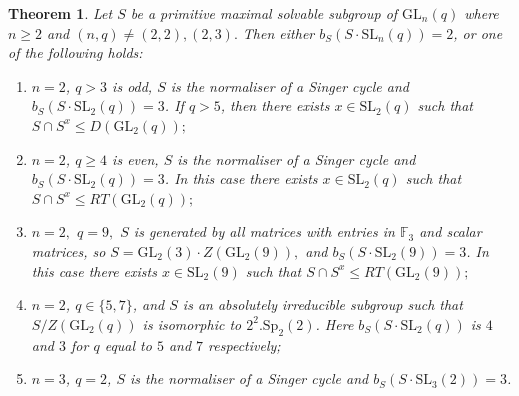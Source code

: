 \documentclass[a4paper,reqno,11pt]{amsart}
\newtheorem{Th}{Theorem}[section]
\theoremstyle{definition}
\theoremstyle{remark}
\numberwithin{equation}{section}
\newcommand{\SL}{{\mathrm{SL}}}
\newcommand{\GL}{{\mathrm{GL}}}
\newcommand{\Sp}{{\mathrm{Sp}}}
\begin{document}
\begin{Th}
\label{sec311lem}
 Let $S$ be a primitive maximal solvable subgroup of $\GL_n(q)$ where $n \ge 2$ and  $(n,q) \ne (2,2), (2,3).$
Then either $b_S(S \cdot \SL_n(q))=2$, or one of the following holds:
\begin{enumerate}[font=\normalfont]
\item $n =2$,  $q>3$ is odd,  $S$ is the normaliser of a Singer cycle and  $b_S(S \cdot \SL_2(q))=3$. If $q>5$, then there exists $x\in \SL_2(q)$ such that  $S \cap S^x \le D(\GL_2(q));$ \label{thirr2odd}
\item $n =2$,  $q\ge 4$ is even,  $S$ is the normaliser of a Singer cycle and  $b_S(S \cdot \SL_2(q))=3$. In this case there exists $x\in \SL_2(q)$ such that  $S \cap S^x \le RT(\GL_2(q));$ \label{thirr2even}
\item $n=2,$ $q=9,$ $S$ is generated by all matrices with entries in $\mathbb{F}_3$ and scalar matrices, so $S=\GL_2(3) \cdot Z(\GL_2(9)),$ and  $b_S(S \cdot \SL_2(9))=3$.  In this case there exists $x\in \SL_2(9)$ such that  $S \cap S^x \le RT(\GL_2(9));$ \label{thirr29}
\item $n=2$, $q \in \{5,7\}$, and $S$  is an absolutely irreducible subgroup such that $S/Z(\GL_2(q))$ is isomorphic to $2^2.\Sp_2(2)$. Here  $b_S(S \cdot \SL_2(q))$ is $4$ and $3$ for $q$ equal to $5$ and $7$ respectively;
\item $n=3$, $q=2$,   $S$ is the normaliser of a Singer cycle and  $b_S(S \cdot \SL_3(2))=3$. \label{thirr32} 
\end{enumerate}  
\end{Th}
\end{document}

